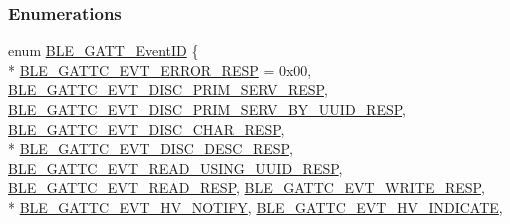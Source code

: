 \subsubsection*{Enumerations}
\begin{DoxyCompactItemize}
\item 
enum \hyperlink{group___b_l_e___g_a_t_t_ga0a64d101980333994dbe7959f99d6b33}{B\+L\+E\+\_\+\+G\+A\+T\+T\+\_\+\+Event\+ID} \{ \\*
\hyperlink{group___b_l_e___g_a_t_t_gga0a64d101980333994dbe7959f99d6b33a1a18dcb334e1358be4c3035f4d3e4b0d}{B\+L\+E\+\_\+\+G\+A\+T\+T\+C\+\_\+\+E\+V\+T\+\_\+\+E\+R\+R\+O\+R\+\_\+\+R\+E\+SP} = 0x00, 
\hyperlink{group___b_l_e___g_a_t_t_gga0a64d101980333994dbe7959f99d6b33a14aeaed03f5690ff9fbaa04571e2e2d0}{B\+L\+E\+\_\+\+G\+A\+T\+T\+C\+\_\+\+E\+V\+T\+\_\+\+D\+I\+S\+C\+\_\+\+P\+R\+I\+M\+\_\+\+S\+E\+R\+V\+\_\+\+R\+E\+SP}, 
\hyperlink{group___b_l_e___g_a_t_t_gga0a64d101980333994dbe7959f99d6b33a0f4546f4d45ad997b4c8bae4b6c44315}{B\+L\+E\+\_\+\+G\+A\+T\+T\+C\+\_\+\+E\+V\+T\+\_\+\+D\+I\+S\+C\+\_\+\+P\+R\+I\+M\+\_\+\+S\+E\+R\+V\+\_\+\+B\+Y\+\_\+\+U\+U\+I\+D\+\_\+\+R\+E\+SP}, 
\hyperlink{group___b_l_e___g_a_t_t_gga0a64d101980333994dbe7959f99d6b33a71f60d4b70314bd778bfcd124862d5fb}{B\+L\+E\+\_\+\+G\+A\+T\+T\+C\+\_\+\+E\+V\+T\+\_\+\+D\+I\+S\+C\+\_\+\+C\+H\+A\+R\+\_\+\+R\+E\+SP}, 
\\*
\hyperlink{group___b_l_e___g_a_t_t_gga0a64d101980333994dbe7959f99d6b33a22f3a1d0d3d03a9471ec8432aef7eb7e}{B\+L\+E\+\_\+\+G\+A\+T\+T\+C\+\_\+\+E\+V\+T\+\_\+\+D\+I\+S\+C\+\_\+\+D\+E\+S\+C\+\_\+\+R\+E\+SP}, 
\hyperlink{group___b_l_e___g_a_t_t_gga0a64d101980333994dbe7959f99d6b33a78fd49490c51e31db9db4e33f4e887c6}{B\+L\+E\+\_\+\+G\+A\+T\+T\+C\+\_\+\+E\+V\+T\+\_\+\+R\+E\+A\+D\+\_\+\+U\+S\+I\+N\+G\+\_\+\+U\+U\+I\+D\+\_\+\+R\+E\+SP}, 
\hyperlink{group___b_l_e___g_a_t_t_gga0a64d101980333994dbe7959f99d6b33a4ec62a1a663a7ef8eda32b53d2cdd723}{B\+L\+E\+\_\+\+G\+A\+T\+T\+C\+\_\+\+E\+V\+T\+\_\+\+R\+E\+A\+D\+\_\+\+R\+E\+SP}, 
\hyperlink{group___b_l_e___g_a_t_t_gga0a64d101980333994dbe7959f99d6b33a9d2e19b620346ad298b99f542f36cde1}{B\+L\+E\+\_\+\+G\+A\+T\+T\+C\+\_\+\+E\+V\+T\+\_\+\+W\+R\+I\+T\+E\+\_\+\+R\+E\+SP}, 
\\*
\hyperlink{group___b_l_e___g_a_t_t_gga0a64d101980333994dbe7959f99d6b33a8cb8b5b834bc84e0b81dd622a3021f95}{B\+L\+E\+\_\+\+G\+A\+T\+T\+C\+\_\+\+E\+V\+T\+\_\+\+H\+V\+\_\+\+N\+O\+T\+I\+FY}, 
\hyperlink{group___b_l_e___g_a_t_t_gga0a64d101980333994dbe7959f99d6b33ababe9d810c6ecb62d16b0d4682660f46}{B\+L\+E\+\_\+\+G\+A\+T\+T\+C\+\_\+\+E\+V\+T\+\_\+\+H\+V\+\_\+\+I\+N\+D\+I\+C\+A\+TE}, 

\end{DoxyCompactItemize}
